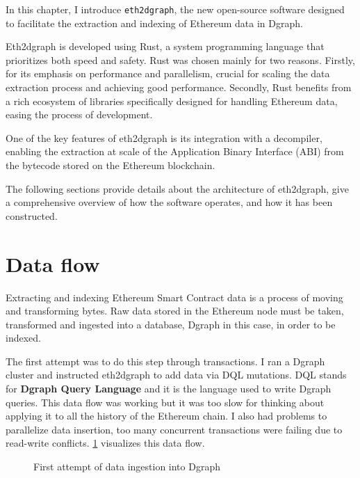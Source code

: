 \label{chapter-4}

\noindent In this chapter, I introduce {\tt eth2dgraph}, the new open-source software designed to facilitate the extraction and indexing of Ethereum data in Dgraph.

Eth2dgraph is developed using Rust, a system programming language that prioritizes both speed and safety. Rust was chosen mainly for two reasons. Firstly, for its emphasis on performance and parallelism, crucial for scaling the data extraction process and achieving good performance. Secondly, Rust benefits from a rich ecosystem of libraries specifically designed for handling Ethereum data, easing the process of development.

One of the key features of eth2dgraph is its integration with a decompiler, enabling the extraction at scale of the Application Binary Interface (ABI) from the bytecode stored on the Ethereum blockchain. 

The following sections provide details about the architecture of eth2dgraph, give a comprehensive overview of how the software operates, and how it has been constructed.

\section{Data flow}

Extracting and indexing Ethereum Smart Contract data is a process of moving and transforming bytes. Raw data stored in the Ethereum node must be taken, transformed and ingested into a database, Dgraph in this case, in order to be indexed. 

The first attempt was to do this step through transactions. I ran a Dgraph cluster and instructed eth2dgraph to add data via DQL mutations. DQL stands for \textbf{Dgraph Query Language} and it is the language used to write Dgraph queries. This data flow was working but it was too slow for thinking about applying it to all the history of the Ethereum chain. I also had problems to parallelize data insertion, too many concurrent transactions were failing due to read-write conflicts. \cref{fig:data-flow-1} visualizes this data flow.

\begin{figure}[H]
\centering
{}
\caption[First attempt of data ingestion into Dgraph]{First attempt of data ingestion into Dgraph}
\label{fig:data-flow-1}
\end{figure}

